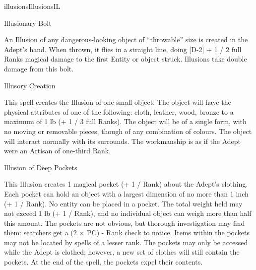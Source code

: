 \begin{College}[1.5]{illusions}{Illusions}{IL}
\begin{spell}[S-2]{Illusionary Bolt}

\begin{effects}
An Illusion of any dangerous-looking object of “throwable” size is
created in the Adept’s hand. When thrown, it flies in a straight line,
doing [D-2] + 1 / 2 full Ranks magical damage to the first Entity or
object struck.  Illusions take double damage from this bolt.
\end{effects}
\end{spell}

\begin{spell}[S-3]{Illusory Creation}

\begin{effects}
This spell creates the Illusion of one small object. The object will
have the physical attributes of one of the following: cloth, leather,
wood, bronze to a maximum of 1 lb (+ 1 / 3 full Ranks).  The object
will be of a single form, with no moving or removable pieces, though
of any combination of colours.  The object will interact normally with
its surrounds.  The workmanship is as if the Adept were an Artisan of
one-third Rank.
\end{effects}
\end{spell}

\begin{spell}[S-4]{Illusion of Deep Pockets}

\begin{effects}
This Illusion creates 1 magical pocket (+ 1 / Rank) about the Adept’s
clothing.  Each pocket can hold an object with a largest dimension of
no more than 1 inch (+ 1 / Rank).  No entity can be placed in a
pocket.  The total weight held may not exceed 1 lb (+ 1 / Rank), and
no individual object can weigh more than half this amount. The pockets
are not obvious, but thorough investigation may find them: searchers
get a (2 × PC) - Rank check to notice. Items within the pockets may
not be located by spells of a lesser rank. The pockets may only be
accessed while the Adept is clothed; however, a new set of clothes
will still contain the pockets. At the end of the spell, the pockets
expel their contents.
\end{effects}
\end{spell}


\end{College}
